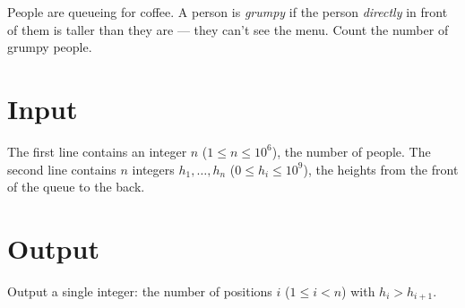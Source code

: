 
People are queueing for coffee. A person is \emph{grumpy} if the person
{\em directly} in front of them is taller than they are --- they can't see the
menu. Count the number of grumpy people.


\section*{Input}
The first line contains an integer $n$ ($1 \le n \le 10^6$), the number
of people. The second line contains $n$ integers $h_1, \dots, h_n$
($0 \le h_i \le 10^9$), the heights from the front of the queue to the
back.

\section*{Output}
Output a single integer: the number of positions $i$ ($1 \le i < n$)
with $h_i > h_{i+1}$.
